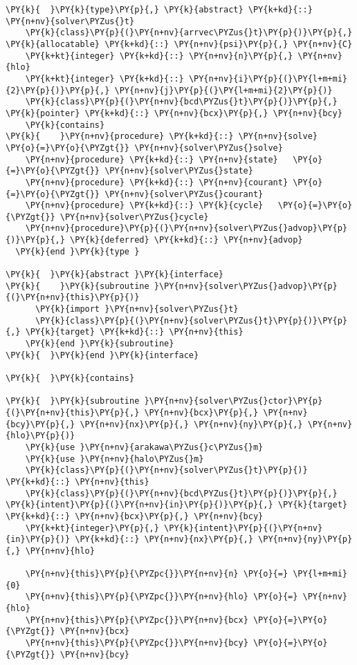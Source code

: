 \begin{Verbatim}[commandchars=\\\{\}]
\PY{k}{  }\PY{k}{type}\PY{p}{,} \PY{k}{abstract} \PY{k+kd}{::} \PY{n+nv}{solver\PYZus{}t}
    \PY{k}{class}\PY{p}{(}\PY{n+nv}{arrvec\PYZus{}t}\PY{p}{)}\PY{p}{,} \PY{k}{allocatable} \PY{k+kd}{::} \PY{n+nv}{psi}\PY{p}{,} \PY{n+nv}{C}
    \PY{k+kt}{integer} \PY{k+kd}{::} \PY{n+nv}{n}\PY{p}{,} \PY{n+nv}{hlo}
    \PY{k+kt}{integer} \PY{k+kd}{::} \PY{n+nv}{i}\PY{p}{(}\PY{l+m+mi}{2}\PY{p}{)}\PY{p}{,} \PY{n+nv}{j}\PY{p}{(}\PY{l+m+mi}{2}\PY{p}{)} 
    \PY{k}{class}\PY{p}{(}\PY{n+nv}{bcd\PYZus{}t}\PY{p}{)}\PY{p}{,} \PY{k}{pointer} \PY{k+kd}{::} \PY{n+nv}{bcx}\PY{p}{,} \PY{n+nv}{bcy}
    \PY{k}{contains}
\PY{k}{    }\PY{n+nv}{procedure} \PY{k+kd}{::} \PY{n+nv}{solve}   \PY{o}{=}\PY{o}{\PYZgt{}} \PY{n+nv}{solver\PYZus{}solve}
    \PY{n+nv}{procedure} \PY{k+kd}{::} \PY{n+nv}{state}   \PY{o}{=}\PY{o}{\PYZgt{}} \PY{n+nv}{solver\PYZus{}state}
    \PY{n+nv}{procedure} \PY{k+kd}{::} \PY{n+nv}{courant} \PY{o}{=}\PY{o}{\PYZgt{}} \PY{n+nv}{solver\PYZus{}courant}
    \PY{n+nv}{procedure} \PY{k+kd}{::} \PY{k}{cycle}   \PY{o}{=}\PY{o}{\PYZgt{}} \PY{n+nv}{solver\PYZus{}cycle}
    \PY{n+nv}{procedure}\PY{p}{(}\PY{n+nv}{solver\PYZus{}advop}\PY{p}{)}\PY{p}{,} \PY{k}{deferred} \PY{k+kd}{::} \PY{n+nv}{advop}
  \PY{k}{end }\PY{k}{type }

\PY{k}{  }\PY{k}{abstract }\PY{k}{interface}
\PY{k}{    }\PY{k}{subroutine }\PY{n+nv}{solver\PYZus{}advop}\PY{p}{(}\PY{n+nv}{this}\PY{p}{)}
      \PY{k}{import }\PY{n+nv}{solver\PYZus{}t}
      \PY{k}{class}\PY{p}{(}\PY{n+nv}{solver\PYZus{}t}\PY{p}{)}\PY{p}{,} \PY{k}{target} \PY{k+kd}{::} \PY{n+nv}{this}
    \PY{k}{end }\PY{k}{subroutine}
\PY{k}{  }\PY{k}{end }\PY{k}{interface}

\PY{k}{  }\PY{k}{contains}

\PY{k}{  }\PY{k}{subroutine }\PY{n+nv}{solver\PYZus{}ctor}\PY{p}{(}\PY{n+nv}{this}\PY{p}{,} \PY{n+nv}{bcx}\PY{p}{,} \PY{n+nv}{bcy}\PY{p}{,} \PY{n+nv}{nx}\PY{p}{,} \PY{n+nv}{ny}\PY{p}{,} \PY{n+nv}{hlo}\PY{p}{)}
    \PY{k}{use }\PY{n+nv}{arakawa\PYZus{}c\PYZus{}m}
    \PY{k}{use }\PY{n+nv}{halo\PYZus{}m}
    \PY{k}{class}\PY{p}{(}\PY{n+nv}{solver\PYZus{}t}\PY{p}{)} \PY{k+kd}{::} \PY{n+nv}{this}
    \PY{k}{class}\PY{p}{(}\PY{n+nv}{bcd\PYZus{}t}\PY{p}{)}\PY{p}{,} \PY{k}{intent}\PY{p}{(}\PY{n+nv}{in}\PY{p}{)}\PY{p}{,} \PY{k}{target} \PY{k+kd}{::} \PY{n+nv}{bcx}\PY{p}{,} \PY{n+nv}{bcy}
    \PY{k+kt}{integer}\PY{p}{,} \PY{k}{intent}\PY{p}{(}\PY{n+nv}{in}\PY{p}{)} \PY{k+kd}{::} \PY{n+nv}{nx}\PY{p}{,} \PY{n+nv}{ny}\PY{p}{,} \PY{n+nv}{hlo}

    \PY{n+nv}{this}\PY{p}{\PYZpc{}}\PY{n+nv}{n} \PY{o}{=} \PY{l+m+mi}{0}
    \PY{n+nv}{this}\PY{p}{\PYZpc{}}\PY{n+nv}{hlo} \PY{o}{=} \PY{n+nv}{hlo}
    \PY{n+nv}{this}\PY{p}{\PYZpc{}}\PY{n+nv}{bcx} \PY{o}{=}\PY{o}{\PYZgt{}} \PY{n+nv}{bcx}
    \PY{n+nv}{this}\PY{p}{\PYZpc{}}\PY{n+nv}{bcy} \PY{o}{=}\PY{o}{\PYZgt{}} \PY{n+nv}{bcy}


\end{Verbatim}
